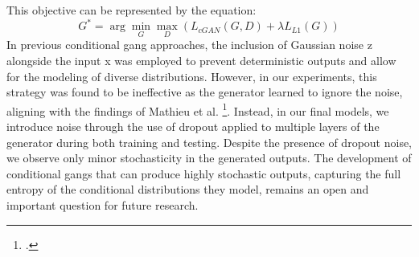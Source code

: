 This objective can be represented by the equation:
\begin{equation}
    G^* = \arg \min_G \max_D \left( L_{cGAN}(G, D) + \lambda L_{L1}(G) \right)
\end{equation}
In previous conditional \gls{gang} approaches, the inclusion of Gaussian noise z alongside the input x was employed to prevent deterministic outputs and allow for the modeling of diverse distributions. 
However, in our experiments, this strategy was found to be ineffective as the generator learned to ignore the noise, aligning with the findings of Mathieu et al. \footcite{paper:MMathieuICLR16}. 
Instead, in our final models, we introduce noise through the use of dropout applied to multiple layers of the generator during both training and testing. 
Despite the presence of dropout noise, we observe only minor stochasticity in the generated outputs. 
The development of conditional \gls{gang}s that can produce highly stochastic outputs, capturing the full entropy of the conditional distributions they model, remains an open and important question for future research.
